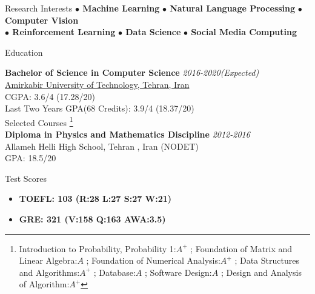 \documentclass{resume} %
\begin{document}
	
	\begin{rSection}{Research Interests}
			\textbf{$\bullet$ Machine Learning} \hspace*{16pt}
			\textbf{ $\bullet$ Natural Language Processing}\hspace*{16pt}
			\textbf{ $\bullet$ Computer Vision}\hspace*{16pt}\\
			\textbf{ $\bullet$ ًReinforcement Learning}\hspace*{16pt}
			\textbf{ $\bullet$ Data Science}\hspace*{16pt}
			\textbf{ $\bullet$ Social Media Computing}	\hspace*{16pt}	

	\end{rSection}
	
	
	\begin{rSection}{Education}
		
		{\bf Bachelor of Science in Computer Science} \hfill {\em 2016-2020(Expected)} \\ 
		\href{https://www.topuniversities.com/universities/amirkabir-university-technology}{Amirkabir University of Technology, Tehran, Iran}\\
		CGPA: 3.6/4 (17.28/20)\\
		Last Two Years GPA(68 Credits): 3.9/4 (18.37/20)\\
		Selected Courses
		\footnote{Introduction to Probability, Probability 1:$A^{+}$ ; Foundation of Matrix and Linear Algebra:$A$ ; Foundation of Numerical Analysis:$A^{+}$ ;  Data Structures and Algorithms:$A^{+}$ ; Database:$A$ ; Software Design:$A$ ; Design and Analysis of Algorithm:$A^{+}$}\\
		{\bf Diploma in Physics and Mathematics Discipline} \hfill {\em 2012-2016}\\ 
		Allameh Helli High School, Tehran , Iran (NODET)\\
		GPA: 18.5/20\\
		
	\end{rSection}
	\begin{rSection}{Test Scores}
		\begin{itemize}{\bfseries}
			\item {\bfseries TOEFL: 103 (R:28 L:27 S:27 W:21)}
			\item {\bfseries GRE: 321 (V:158 Q:163 AWA:3.5)}
		\end{itemize}
		
	\end{rSection}
	
\end{document}
